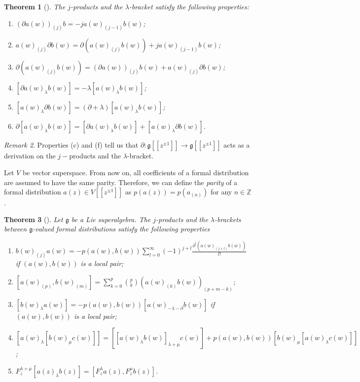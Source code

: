 \documentclass[a4paper, 12pt, reqno]{amsart}
\newtheorem{theorem}{Theorem}[subsection]
\theoremstyle{remark}
\newtheorem{remark}[theorem]{Remark}
\numberwithin{equation}{subsection}
\begin{document}
\begin{theorem}[{\cite[\S2.3]{nozaradan_introduction_2008}}]
  \label{thr:3}
  The $j$-products and the $\lambda$-bracket satisfy the following properties:
  \begin{enumerate}
  \item $(\partial a(w))_{(j)}b = -ja(w)_{(j - 1)}b(w)$;
  \item $a(w)_{(j)}\partial b(w) = \partial(a(w)_{(j)}b(w)) + ja(w)_{(j - 1)}b(w)$;
  \item $\partial(a(w)_{(j)}b(w))=(\partial a(w))_{(j)}b(w)+a(w)_{(j)}\partial b(w)$;
  \item $[\partial a(w)_{\lambda}b(w)] = -\lambda [a(w)_{\lambda}b(w)]$;
  \item $[a(w)_{\lambda}\partial b(w)] = (\partial + \lambda)[a(w)_{\lambda}b(w)]$;
  \item $\partial[a(w)_\lambda b(w)]=[\partial a(w)_\lambda b(w)]+[a(w)_\lambda \partial b(w)]$.
  \end{enumerate}
\end{theorem}
\begin{remark}
  \label{rmk:3}
  Properties (c) and (f) tell us that $\partial: \mathfrak{g}[[z^{\pm 1}]] \to \mathfrak{g}[[z^{\pm 1}]]$ acts as a derivation on the $j-$products and the $\lambda$-bracket.
\end{remark}

Let $V$ be vector superspace.
From now on, all coefficients of a formal distribution are assumed to have the same parity.
Therefore, we can define the \emph{parity} of a formal distribution $a(z) \in V[[z^{\pm 1}]]$ as $p(a(z)) = p(a_{(n)})$ for any $n \in \mathbb{Z}$.

\begin{theorem}[{\cite[\S2.3]{nozaradan_introduction_2008}}]
  \label{thr:4}
  Let $\mathfrak{g}$ be a Lie superalgebra.
  The $j$-products and the $\lambda$-brackets between $\mathfrak{g}$-valued formal distributions satisfy the following properties
  \begin{enumerate}
  \item $b(w)_{(j)}a(w) = -p(a(w), b(w))\sum_{l = 0}^{\infty}(-1)^{j + l}\frac{\partial^l(a(w)_{(j + l)}b(w))}{l!}$ if $(a(w), b(w))$ is a local pair;
  \item $[a(w)_{(p)}, b(w)_{(m)}] = \sum_{k = 0}^p\binom{p}{k}(a(w)_{(k)}b(w))_{(p + m - k)}$;
  \item $[b(w)_{\lambda}a(w)] = -p(a(w), b(w))[a(w)_{-\lambda - \partial}b(w)]$ if $(a(w), b(w))$ is a local pair;
  \item $[a(w)_{\lambda}[b(w)_{\mu}c(w)]] = [[a(w)_{\lambda}b(w)]_{\lambda + \mu}c(w)] + p(a(w), b(w))[b(w)_{\mu}[a(w)_{\lambda}c(w)]]$;
  \item $F^{\lambda + \mu}_z[a(z)_{\lambda}b(z)] = [F^{\lambda}_za(z), F^{\mu}_zb(z)]$.
  \end{enumerate}
\end{theorem}
\end{document}
